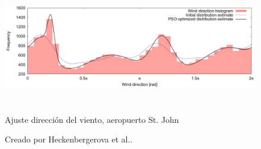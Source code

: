 \begin{figure}[h!]
    \centering    
    \includegraphics[height=50mm]{figures/dir_pso.png} 
    \caption{Ajuste dirección del viento, aeropuerto St. John}
    \vspace{-.25cm} 
    \caption*{Creado por Heckenbergerova et al.\cite{Heckenbergerova15}.}
    \label{fig:dir_pso}
\end{figure}

